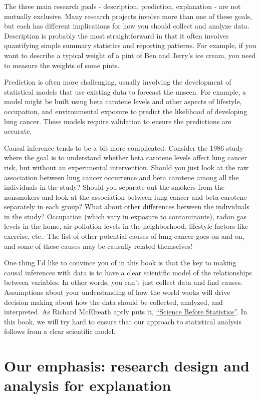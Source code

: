 \documentclass[
]{book}
\begin{document}
The three main research goals - description, prediction, explanation - are not mutually exclusive. Many research projects involve more than one of these goals, but each has different implications for how you should collect and analyze data. Description is probably the most straightforward in that it often involves quantifying simple summary statistics and reporting patterns. For example, if you want to describe a typical weight of a pint of Ben and Jerry's ice cream, you need to measure the weights of some pints.

Prediction is often more challenging, usually involving the development of statistical models that use existing data to forecast the unseen. For example, a model might be built using beta carotene levels and other aspects of lifestyle, occupation, and environmental exposure to predict the likelihood of developing lung cancer. These models require validation to ensure the predictions are accurate.

Causal inference tends to be a bit more complicated. Consider the 1986 study where the goal is to understand whether beta carotene levels affect lung cancer risk, but without an experimental intervention. Should you just look at the raw association between lung cancer occurrence and beta carotene among all the individuals in the study? Should you separate out the smokers from the nonsmokers and look at the association between lung cancer and beta carotene separately in each group? What about other differences between the individuals in the study? Occupation (which vary in exposure to contaminants), radon gas levels in the home, air pollution levels in the neighborhood, lifestyle factors like exercise, etc.. The list of other potential causes of lung cancer goes on and on, and some of these causes may be causally related themselves!

One thing I'd like to convince you of in this book is that the key to making causal inferences with data is to have a clear scientific model of the relationships between variables. In other words, you can't just collect data and find causes. Assumptions about your understanding of how the world works will drive decision making about how the data should be collected, analyzed, and interpreted. As Richard McElreath aptly puts it, \href{https://www.youtube.com/watch?v=KNPYUVmY3NM}{``Science Before Statistics''}. In this book, we will try hard to ensure that our approach to statistical analysis follows from a clear scientific model.

\section{Our emphasis: research design and analysis for explanation}\label{our-emphasis-research-design-and-analysis-for-explanation}
\end{document}
